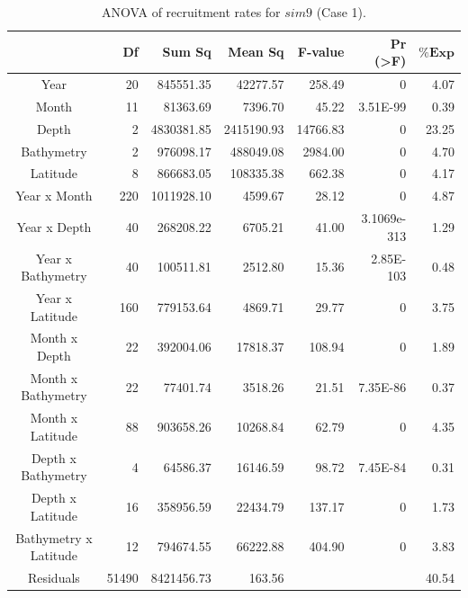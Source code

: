 \begin{table}[H]
\centering
\begin{adjustbox}{width=0.9\textwidth}
\small
\begin{tabular}{c|r|r|r|r|r|r}
\hline
                                  &
	\textbf{Df}                   &
	\textbf{Sum Sq}               &
	\textbf{Mean Sq}              &
	\textbf{F-value}    		   &
	\textbf{Pr (\textgreater{F})} &
	$\mathbf{\% Exp}$      \\
\hline
Year                  & 20	 & 845551.35  & 42277.57   & 258.49	   & 0	         & 4.07\\
Month                 & 11	 & 81363.69	  & 7396.70    & 45.22	   & 3.51E-99	 &0.39  \\
Depth                 & 2	 & 4830381.85 & 2415190.93 & 14766.83 & 0 			 & 23.25 \\
Bathymetry            & 2	 & 976098.17  & 488049.08  & 2984.00  & 0	         &4.70 \\
Latitude              & 8	 & 866683.05  & 108335.38  & 662.38	   & 0			 & 4.17\\
Year x Month          & 220 & 1011928.10 &	4599.67    & 28.12    & 0	         & 4.87  \\
Year x Depth          & 40	 & 268208.22  & 6705.21	   & 41.00	   & 3.1069e-313 & 1.29 \\
Year x Bathymetry     & 40  & 100511.81  & 2512.80	   & 15.36	   & 2.85E-103	 & 0.48 \\
Year x Latitude       & 160 & 779153.64  &	4869.71	   & 29.77	   & 0	         & 3.75  \\
Month x Depth         & 22	 & 392004.06  & 17818.37  &108.94	   & 0	         & 1.89 \\
Month x Bathymetry    & 22	 & 77401.74	  & 3518.26	   &21.51	   & 7.35E-86	 & 0.37  \\
Month x Latitude      & 88	 & 903658.26  & 10268.84  & 62.79	   & 0	         & 4.35  \\
Depth x Bathymetry    & 4	 & 64586.37	  & 16146.59   &98.72	   & 7.45E-84	 & 0.31  \\
Depth x Latitude      & 16	 & 358956.59  & 22434.79  & 137.17	   & 0	         &1.73 \\
Bathymetry x Latitude & 12	 & 794674.55  & 66222.88  & 404.90	   & 0	         & 3.83  \\
Residuals             & 51490	& 8421456.73 &163.56  & & 						 & 40.54\\
\hline
\end{tabular}
\end{adjustbox}
\caption{ANOVA of recruitment rates for $sim 9$ (Case 1).}
\label{ANOVAsim9}
\end{table}

